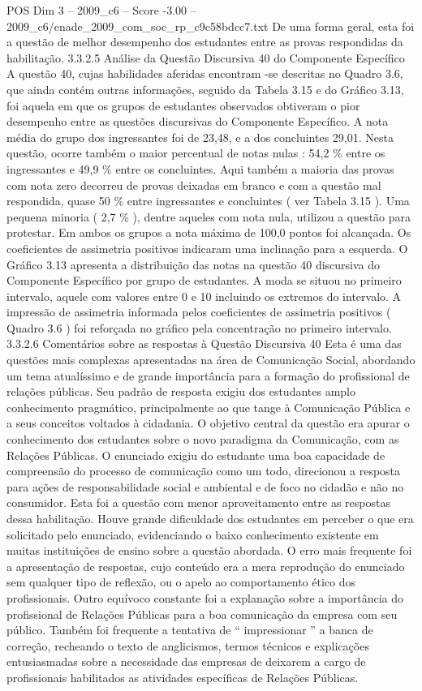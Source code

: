 \begin{textsample}{POS Dim 3 – 2009\_c6 – Score -3.00 – 2009\_c6/enade\_2009\_com\_soc\_rp\_c9c58bdcc7.txt}
De uma forma geral, esta foi a questão de melhor desempenho dos estudantes entre as provas respondidas da habilitação. 3.3.2.5 Análise da Questão Discursiva 40 do Componente Específico A questão 40, cujas habilidades aferidas encontram -se descritas no Quadro 3.6, que ainda contém outras informações, seguido da Tabela 3.15 e do Gráfico 3.13, foi aquela em que os grupos de estudantes observados obtiveram o pior desempenho entre as questões discursivas do Componente Específico.
A nota média do grupo dos ingressantes foi de 23,48, e a dos concluintes 29,01.
Nesta questão, ocorre também o maior percentual de notas nulas : 54,2 \% entre os ingressantes e 49,9 \% entre os concluintes.
Aqui também a maioria das provas com nota zero decorreu de provas deixadas em branco e com a questão mal respondida, quase 50 \% entre ingressantes e concluintes ( ver Tabela 3.15 ).
Uma pequena minoria ( 2,7 \% ), dentre aqueles com nota nula, utilizou a questão para protestar.
Em ambos os grupos a nota máxima de 100,0 pontos foi alcançada.
Os coeficientes de assimetria positivos indicaram uma inclinação para a esquerda.
O Gráfico 3.13 apresenta a distribuição das notas na questão 40 discursiva do Componente Específico por grupo de estudantes.
A moda se situou no primeiro intervalo, aquele com valores entre 0 e 10 incluindo os extremos do intervalo.
A impressão de assimetria informada pelos coeficientes de assimetria positivos ( Quadro 3.6 ) foi reforçada no gráfico pela concentração no primeiro intervalo. 3.3.2.6 Comentários sobre as respostas à Questão Discursiva 40 Esta é uma das questões mais complexas apresentadas na área de Comunicação Social, abordando um tema atualíssimo e de grande importância para a formação do profissional de relações públicas.
Seu padrão de resposta exigiu dos estudantes amplo conhecimento pragmático, principalmente ao que tange à Comunicação Pública e a seus conceitos voltados à cidadania.
O objetivo central da questão era apurar o conhecimento dos estudantes sobre o novo paradigma da Comunicação, com as Relações Públicas.
O enunciado exigiu do estudante uma boa capacidade de compreensão do processo de comunicação como um todo, direcionou a resposta para ações de responsabilidade social e ambiental e de foco no cidadão e não no consumidor.
Esta foi a questão com menor aproveitamento entre as respostas dessa habilitação.
Houve grande dificuldade dos estudantes em perceber o que era solicitado pelo enunciado, evidenciando o baixo conhecimento existente em muitas instituições de ensino sobre a questão abordada.
O erro mais frequente foi a apresentação de respostas, cujo conteúdo era a mera reprodução do enunciado sem qualquer tipo de reflexão, ou o apelo ao comportamento ético dos profissionais.
Outro equívoco constante foi a explanação sobre a importância do profissional de Relações Públicas para a boa comunicação da empresa com seu público.
Também foi frequente a tentativa de “ impressionar ” a banca de correção, recheando o texto de anglicismos, termos técnicos e explicações entusiasmadas sobre a necessidade das empresas de deixarem a cargo de profissionais habilitados as atividades específicas de Relações Públicas.

\end{textsample}
